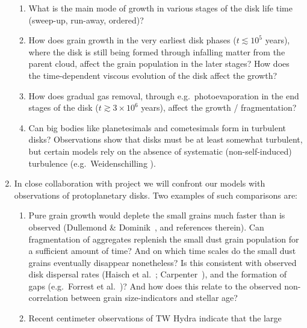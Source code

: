 \begin{enumerate}
\begin{enumerate}
\item What is the main mode of growth in various stages of the disk
life time (sweep-up, run-away, ordered)?
\item How does grain growth in the very earliest disk phases ($t\lesssim
10^5$ years), where the disk is still being formed through infalling matter
from the parent cloud, affect the grain population in the later stages? How
does the time-dependent viscous evolution of the disk affect the growth?
\item How does gradual gas removal, through e.g.~photoevaporation in the
end stages of the disk ($t\gtrsim 3\times 10^6$ years), affect the growth /
fragmentation?
\item Can big bodies like planetesimals and cometesimals form in turbulent 
disks? Observations show that disks must be at least somewhat turbulent, but
certain models rely on the absence of systematic (non-self-induced)
turbulence (e.g.~Weidenschilling ).
\end{enumerate}
\item In close collaboration with project \projwolf{} we will confront our
models with observations of protoplanetary disks. Two examples of such
comparisons are:
\begin{enumerate}
\item Pure grain growth would deplete the small grains much faster than is
observed (Dullemond \& Dominik~, and references therein). Can
fragmentation of aggregates replenish the small dust grain population for a
sufficient amount of time?  And on which time scales do the small dust
grains eventually disappear nonetheless? Is this consistent with observed
disk dispersal rates (Haisch et al.~; Carpenter~), and
the formation of gaps (e.g.~Forrest et al.~)? And how does this
relate to the observed non-correlation between grain size-indicators and
stellar age? \label{dulgoal-smallgrains}
\item Recent centimeter observations of TW Hydra indicate that the large

\end{enumerate}
\end{enumerate}
